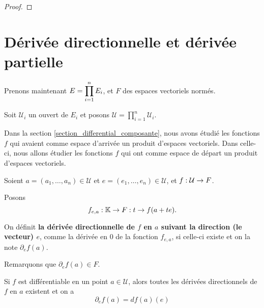 \ifdefined\outputproof
\begin{proof}

\end{proof}
\fi

\section{Dérivée directionnelle et dérivée partielle}
\label{section_directionnal_partial_derivative}

Prenons maintenant $E = \displaystyle \prod_{i = 1}^{n} E_{i}$, et $F$ des espaces vectoriels
normés.

Soit $\mathcal{U}_{i}$ un ouvert de $E_{i}$ et posons $\mathcal{U} =
\displaystyle \prod_{i = 1}^{n} \mathcal{U}_{i}$.

Dans la section \ref{section_differential_composante}, nous avons
étudié les fonctions $f$ qui avaient comme espace d'arrivée un produit d'espaces
vectoriels. Dans celle-ci, nous allons étudier les fonctions $f$ qui ont comme
espace de départ un produit d'espaces vectoriels.


\begin{definition}
	\label{definition:directionnal_application_definition}
	Soient $a = (a_{1}, \ldots, a_{n}) \in \mathcal{U}$ et $e = (e_{1}, \ldots,
	e_{n}) \in \mathcal{U}$,
	et $f : \mathcal{U} \rightarrow F$.

	Posons
	\begin{equation*}
		f_{e, a} : \mathbb{K} \rightarrow F: t \rightarrow f(a + te).
	\end{equation*}

	On définit \textbf{la dérivée directionnelle de $f$ en $a$ suivant la direction (le
	vecteur) $e$}, comme la dérivée en $0$ de la fonction $f_{e, a}$, si celle-ci
	existe et on la note ${\partial_{e} f}(a)$.

	Remarquons que $\partial_{e} f (a) \in F$.
\end{definition}

\begin{proposition}
	Si $f$ est différentiable en un point $a \in \mathcal{U}$, alors toutes les
	dérivées directionnels de $f$ en $a$ existent et on a
	\begin{equation*}
		\partial_{e}f(a) = df(a)(e)
	\end{equation*}
\end{proposition}

